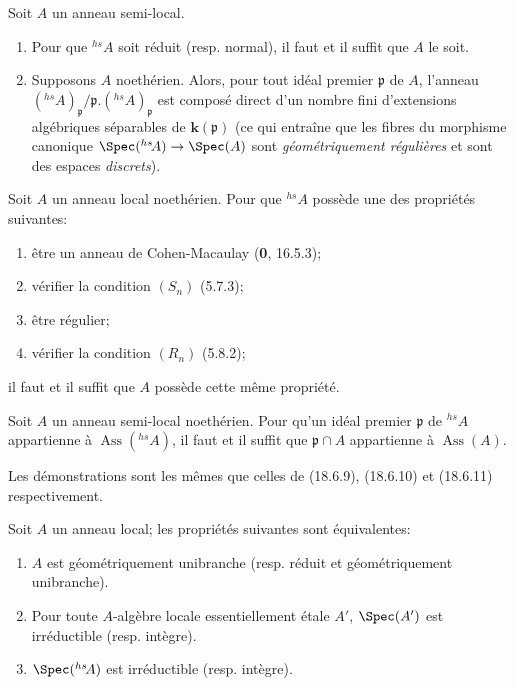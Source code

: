 \begin{proposition}[18.8.12]
\label{IV.18.8.12}
Soit $A$ un anneau semi-local.
\begin{enumerate}
  \item[\textup{(i)}] Pour que ${}^{hs}\!A$ soit réduit \textup{(resp.} normal\textup{)}, il faut et il suffit que $A$ le soit.
  \item[\textup{(ii)}] Supposons $A$ noethérien. Alors, pour tout idéal premier $\mathfrak p$ de $A$, l'anneau $({}^{hs}\!A)_{\mathfrak p}/\mathfrak p.({}^{hs}\!A)_{\mathfrak p}$ est composé direct d'un nombre fini d'extensions algébriques séparables de $\boldsymbol{k}(\mathfrak p)$ \textup{(ce qui entraîne que les fibres du morphisme canonique $\Spec({}^{hs}\!A)\to\Spec(A)$ sont \emph{géométriquement régulières} et sont des espaces \emph{discrets})}.
\end{enumerate}
\end{proposition}

\begin{corollary}[18.8.13]
\label{IV.18.8.13}
Soit $A$ un anneau local noethérien. Pour que ${}^{hs}\!A$ possède une des propriétés suivantes:
\begin{enumerate}
  \item[\textup{a)}] être un anneau de Cohen-Macaulay \textup{(\textbf{0}, 16.5.3)};
  \item[\textup{b)}] vérifier la condition $(S_n)$ \textup{(5.7.3)};
  \item[\textup{c)}] être régulier;
  \item[\textup{d)}] vérifier la condition $(R_n)$ \textup{(5.8.2)};
\end{enumerate}
il faut et il suffit que $A$ possède cette même propriété.
\end{corollary}

\begin{corollary}[18.8.14]
\label{IV.18.8.14}
Soit $A$ un anneau semi-local noethérien. Pour qu'un idéal premier $\mathfrak p$ de ${}^{hs}\!A$ appartienne à $\operatorname{Ass}({}^{hs}\!A)$, il faut et il suffit que $\mathfrak p\cap A$ appartienne à $\operatorname{Ass}(A)$.
\end{corollary}

Les démonstrations sont les mêmes que celles de (18.6.9), (18.6.10) et (18.6.11) respectivement.

\begin{proposition}[18.8.15]
\label{IV.18.8.15}
Soit $A$ un anneau local; les propriétés suivantes sont équivalentes:
\begin{enumerate}
  \item[\textup{a)}] $A$ est géométriquement unibranche \textup{(resp.} réduit et géométriquement unibranche\textup{)}.
  \item[\textup{b)}] Pour toute $A$-algèbre locale essentiellement étale $A'$, $\Spec(A')$ est irréductible \textup{(resp.} intègre\textup{)}.
  \item[\textup{c)}] $\Spec({}^{hs}\!A)$ est irréductible \textup{(resp.} intègre\textup{)}.
\end{enumerate}
\end{proposition}

